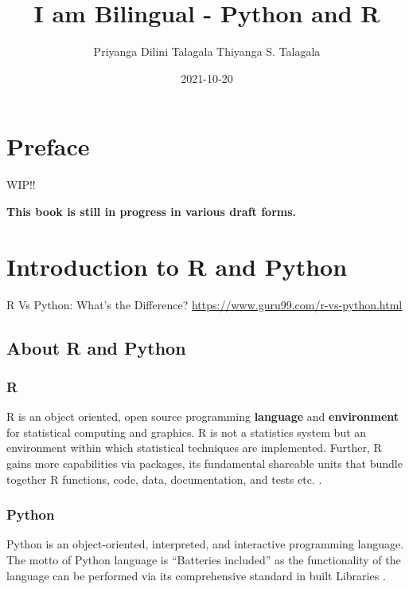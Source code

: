\documentclass[
]{book}
\title{I am Bilingual - Python and R}
\author{Priyanga Dilini Talagala Thiyanga S. Talagala}
\date{2021-10-20}
\begin{document}
\maketitle

{
\setcounter{tocdepth}{1}
\tableofcontents
}
\hypertarget{preface}{%
\chapter*{Preface}\label{preface}}

WIP!!

\textbf{This book is still in progress in various draft forms.}

\hypertarget{intro}{%
\chapter{Introduction to R and Python}\label{intro}}

R Vs Python: What's the Difference? \url{https://www.guru99.com/r-vs-python.html}

\hypertarget{about-r-and-python}{%
\section{About R and Python}\label{about-r-and-python}}

\hypertarget{r}{%
\subsection{R}\label{r}}

R is an object oriented, open source programming \textbf{language} and \textbf{environment} for statistical computing and graphics. R is not a statistics system but an environment within which statistical techniques are implemented. Further, R gains more capabilities via packages, its fundamental shareable units that bundle together R functions, code, data, documentation, and tests etc. \citep{Rcoreteam2020}.

\hypertarget{python}{%
\subsection{Python}\label{python}}

Python is an object-oriented, interpreted, and interactive programming language. The motto of Python language is ``Batteries included'' as the functionality of the language can be performed via its comprehensive standard in built Libraries \citep{wikipython}.
\end{document}
